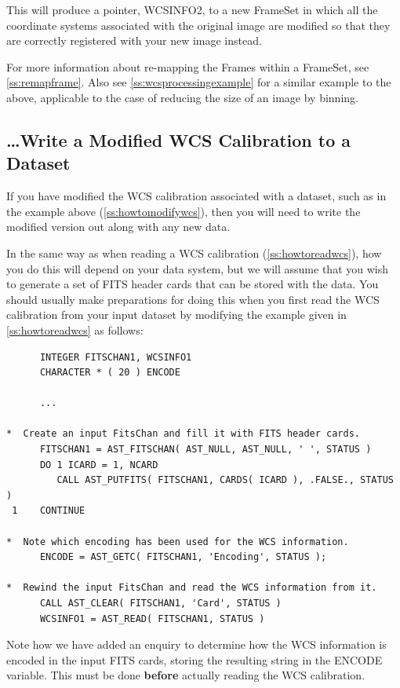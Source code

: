 \documentclass[twoside,11pt]{article}
\newcommand{\secref}[1]{\S\ref{#1}}
\renewcommand{\secref}[1]{\ref{#1}}
\begin{document}
This will produce a pointer, WCSINFO2, to a new FrameSet in which all
the coordinate systems associated with the original image are modified
so that they are correctly registered with your new image instead.

For more information about re-mapping the Frames within a FrameSet,
see \secref{ss:remapframe}. Also see \secref{ss:wcsprocessingexample}
for a similar example to the above, applicable to the case of reducing
the size of an image by binning.

\subsection{\ldots Write a Modified WCS Calibration to a Dataset}

If you have modified the WCS calibration associated with a dataset,
such as in the example above (\secref{ss:howtomodifywcs}), then you
will need to write the modified version out along with any new data.

In the same way as when reading a WCS calibration
(\secref{ss:howtoreadwcs}), how you do this will depend on your data
system, but we will assume that you wish to generate a set of FITS
header cards that can be stored with the data. You should usually make
preparations for doing this when you first read the WCS calibration
from your input dataset by modifying the example given in
\secref{ss:howtoreadwcs} as follows:

\small
\begin{verbatim}
      INTEGER FITSCHAN1, WCSINFO1
      CHARACTER * ( 20 ) ENCODE

      ...

*  Create an input FitsChan and fill it with FITS header cards.
      FITSCHAN1 = AST_FITSCHAN( AST_NULL, AST_NULL, ' ', STATUS )
      DO 1 ICARD = 1, NCARD
         CALL AST_PUTFITS( FITSCHAN1, CARDS( ICARD ), .FALSE., STATUS )
 1    CONTINUE

*  Note which encoding has been used for the WCS information.
      ENCODE = AST_GETC( FITSCHAN1, 'Encoding', STATUS );

*  Rewind the input FitsChan and read the WCS information from it.
      CALL AST_CLEAR( FITSCHAN1, 'Card', STATUS )
      WCSINFO1 = AST_READ( FITSCHAN1, STATUS )
\end{verbatim}
\normalsize

Note how we have added an enquiry to determine how the WCS information
is encoded in the input FITS cards, storing the resulting string in
the ENCODE variable. This must be done {\bf{before}} actually reading
the WCS calibration.
\end{document}
